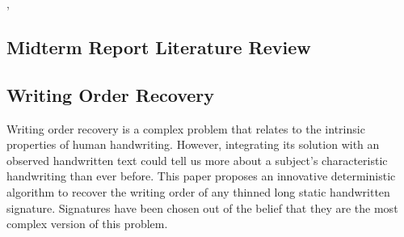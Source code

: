 \documentclass[10pt,twocolumn,letterpaper]{article}
\begin{document}

,\vspace*{-1em}

\subsection*{Midterm Report Literature Review}
\subsection{Writing Order Recovery}
Writing order recovery is a complex problem that relates to the intrinsic properties of human handwriting. However, integrating its solution with an observed handwritten text could tell us more about a subject's characteristic handwriting than ever before. This paper \cite{WOR} proposes an innovative deterministic algorithm to recover the writing order of any thinned long static handwritten signature. Signatures have been chosen out of the belief that they are the most complex version of this problem.
\end{document}

